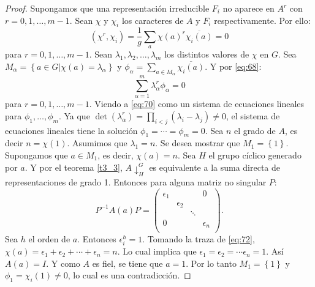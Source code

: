 \documentclass[12pt]{book}
\theoremstyle{definition}
\newcounter{in}
\begin{document}
\begin{proof}
  Supongamos que una representación irreducible $F_{i}$ no aparece en
  $A^{r}$ con $r=0,1,\ldots,m-1$. Sean $\chi$ y $\chi_{i}$ los
  caracteres de $A$ y $F_{i}$ respectivamente. Por ello:
  \begin{equation}
    \label{eq:68}
    (\chi^{r},\chi_{i}) = \frac{1}{g} \sum_{a} \chi(a)^{r} \overline{\chi_{i}(a)}=0
  \end{equation}
  para $r=0,1, \ldots, m-1$. Sean
  $\lambda_{1}, \lambda_{2}, \ldots, \lambda_{m}$ los distintos valores
  de $\chi$ en $G$. Sea
  $M_{\alpha}=\left\{ a \in G | \chi(a)=\lambda_{\alpha} \right\}$ y
  $\phi_{\alpha}= \sum_{a \in M_{\alpha}} \overline{\chi_{i}(a)}$. Y por \ref{eq:68}:
  \begin{equation}
    \label{eq:70}
    \sum_{\alpha=1}^{m} \lambda_{\alpha}^{r} \phi_{\alpha} =0
  \end{equation}
  para $r=0,1, \ldots,m-1$. Viendo a \ref{eq:70} como un sistema de
  ecuaciones lineales para $\phi_{1}, \ldots, \phi_{m}$. Ya que
  $\det (\lambda_{\alpha}^{r}) = \prod_{i<j} (\lambda_{i}-\lambda_{j})
  \neq 0$, el sistema de ecuaciones lineales tiene la solución
  $\phi_{1}= \cdots= \phi_{m}=0$.  Sea $n$ el grado de $A$, es decir
  $n=\chi(1)$. Asumimos que $\lambda_{1}=n$. Se desea mostrar que
  $M_{1}=\left\{ 1 \right\}$. Supongamos que $a \in M_{1}$, es decir,
  $\chi(a)=n$. Sea $H$ el grupo cíclico generado por $a$. Y por el
  teorema \ref{t3_3}, $A\downarrow^{G}_{H}$ es equivalente a la suma directa de
  representaciones de grado 1. Entonces para alguna matriz no singular
  $P$:
  \begin{equation}
    \label{eq:72}
    P^{-1}A(a)P=
    \begin{pmatrix}
      \epsilon_{1} & & & 0 \\ 
      & \epsilon_{2} & & \\
      & & \ddots & \\
      0 & & & \epsilon_{n}\\
    \end{pmatrix}
    .
  \end{equation}
  Sea $h$ el orden de $a$. Entonces $\epsilon_{i}^{h}=1$. Tomando la
  traza de \ref{eq:72},
  $\chi(a) = \epsilon_{1} + \epsilon_{2} + \cdots +
  \epsilon_{n}=n$. Lo cual implica que
  $\epsilon_{1}=\epsilon_{2}= \cdots \epsilon_{n}=1$. Así $A(a)=I$. Y
  como $A$ es fiel, se tiene que $a=1$. Por lo tanto
  $M_{1}=\left\{ 1 \right\}$ y $\phi_{1}= \chi_{i}(1) \neq 0$, lo cual
  es una contradicción.
\end{proof}
\end{document}
